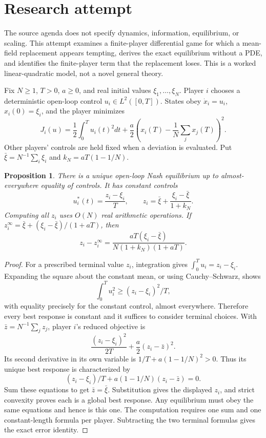 \documentclass[11pt]{article}
\newtheorem{proposition}{Proposition}
\begin{document}
\section{Research attempt}
The source agenda does not specify dynamics, information, equilibrium, or scaling. This attempt examines a finite-player differential game for which a mean-field replacement appears tempting, derives the exact equilibrium without a PDE, and identifies the finite-player term that the replacement loses. This is a worked linear-quadratic model, not a novel general theory.

Fix $N\ge1$, $T>0$, $a\ge0$, and real initial values $\xi_1,\ldots,\xi_N$. Player $i$ chooses a deterministic open-loop control $u_i\in L^2([0,T])$. States obey $\dot x_i=u_i$, $x_i(0)=\xi_i$, and the player minimizes
\[
 J_i(u)=\frac12\int_0^T u_i(t)^2dt+
       \frac a2\left(x_i(T)-\frac1N\sum_jx_j(T)\right)^2.
\]
Other players' controls are held fixed when a deviation is evaluated. Put $\bar\xi=N^{-1}\sum_i\xi_i$ and $k_N=aT(1-1/N)$.

\begin{proposition}
There is a unique open-loop Nash equilibrium up to almost-everywhere equality of controls. It has constant controls
\[
 u_i^*(t)=\frac{z_i-\xi_i}{T},\qquad
 z_i=\bar\xi+\frac{\xi_i-\bar\xi}{1+k_N}.
\]
Computing all $z_i$ uses $O(N)$ real arithmetic operations. If $z_i^{\infty}=\bar\xi+(\xi_i-\bar\xi)/(1+aT)$, then
\[
 z_i-z_i^{\infty}=
 \frac{aT(\xi_i-\bar\xi)}{N(1+k_N)(1+aT)}.
\]
\end{proposition}
\begin{proof}
For a prescribed terminal value $z_i$, integration gives $\int_0^T u_i=z_i-\xi_i$. Expanding the square about the constant mean, or using Cauchy--Schwarz, shows
\[
 \int_0^T u_i^2\ge (z_i-\xi_i)^2/T,
\]
with equality precisely for the constant control, almost everywhere. Therefore every best response is constant and it suffices to consider terminal choices. With $\bar z=N^{-1}\sum_jz_j$, player $i$'s reduced objective is
\[
 \frac{(z_i-\xi_i)^2}{2T}+\frac a2(z_i-\bar z)^2.
\]
Its second derivative in its own variable is $1/T+a(1-1/N)^2>0$. Thus its unique best response is characterized by
\[
 (z_i-\xi_i)/T+a(1-1/N)(z_i-\bar z)=0.
\]
Sum these equations to get $\bar z=\bar\xi$. Substitution gives the displayed $z_i$, and strict convexity proves each is a global best response. Any equilibrium must obey the same equations and hence is this one. The computation requires one sum and one constant-length formula per player. Subtracting the two terminal formulas gives the exact error identity.
\end{proof}
\end{document}
